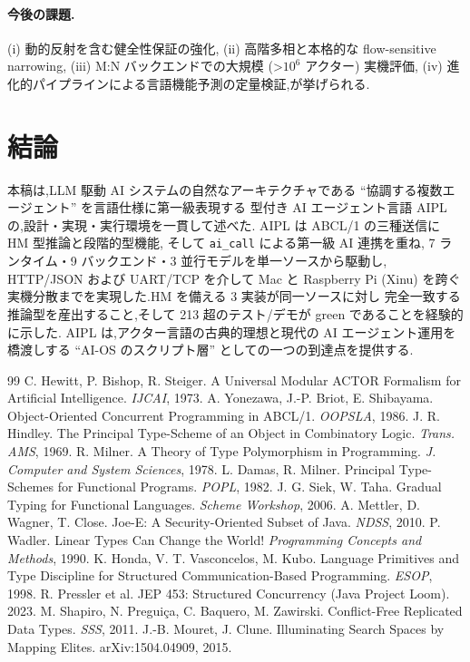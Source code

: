 \documentclass[11pt,a4paper]{article}
\newcommand{\code}[1]{\texttt{\small #1}}
\begin{document}
\paragraph{今後の課題.}
(i) 動的反射を含む健全性保証の強化,
(ii) 高階多相と本格的な flow-sensitive narrowing,
(iii) M:N バックエンドでの大規模 (>$10^6$ アクター) 実機評価,
(iv) 進化的パイプラインによる言語機能予測の定量検証,が挙げられる.

\section{結論}\label{sec:concl}
本稿は,LLM 駆動 AI システムの自然なアーキテクチャである
``協調する複数エージェント'' を言語仕様に第一級表現する
型付き AI エージェント言語 AIPL の,設計・実現・実行環境を一貫して述べた.
AIPL は ABCL/1 の三種送信に HM 型推論と段階的型機能,
そして \code{ai\_call} による第一級 AI 連携を重ね,
7 ランタイム・9 バックエンド・3 並行モデルを単一ソースから駆動し,
HTTP/JSON および UART/TCP を介して Mac と Raspberry Pi (Xinu) を跨ぐ
実機分散までを実現した.HM を備える 3 実装が同一ソースに対し
完全一致する推論型を産出すること,そして 213 超のテスト/デモが
green であることを経験的に示した.
AIPL は,アクター言語の古典的理想と現代の AI エージェント運用を
橋渡しする ``AI-OS のスクリプト層'' としての一つの到達点を提供する.

\begin{thebibliography}{99}
 C. Hewitt, P. Bishop, R. Steiger.
  A Universal Modular ACTOR Formalism for Artificial Intelligence.
  \textit{IJCAI}, 1973.
 A. Yonezawa, J.-P. Briot, E. Shibayama.
  Object-Oriented Concurrent Programming in ABCL/1.
  \textit{OOPSLA}, 1986.
 J. R. Hindley.
  The Principal Type-Scheme of an Object in Combinatory Logic.
  \textit{Trans. AMS}, 1969.
 R. Milner.
  A Theory of Type Polymorphism in Programming.
  \textit{J. Computer and System Sciences}, 1978.
 L. Damas, R. Milner.
  Principal Type-Schemes for Functional Programs.
  \textit{POPL}, 1982.
 J. G. Siek, W. Taha.
  Gradual Typing for Functional Languages.
  \textit{Scheme Workshop}, 2006.
 A. Mettler, D. Wagner, T. Close.
  Joe-E: A Security-Oriented Subset of Java.
  \textit{NDSS}, 2010.
 P. Wadler.
  Linear Types Can Change the World!
  \textit{Programming Concepts and Methods}, 1990.
 K. Honda, V. T. Vasconcelos, M. Kubo.
  Language Primitives and Type Discipline for Structured
  Communication-Based Programming. \textit{ESOP}, 1998.
 R. Pressler et al.
  JEP 453: Structured Concurrency (Java Project Loom). 2023.
 M. Shapiro, N. Pregui\c{c}a, C. Baquero, M. Zawirski.
  Conflict-Free Replicated Data Types. \textit{SSS}, 2011.
 J.-B. Mouret, J. Clune.
  Illuminating Search Spaces by Mapping Elites. arXiv:1504.04909, 2015.
\end{thebibliography}
\end{document}
